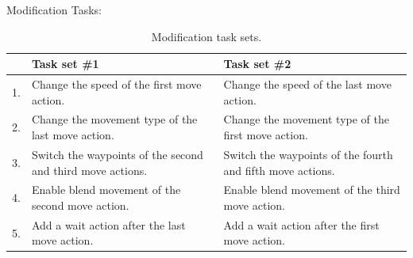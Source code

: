 Modification Tasks:
\begin{table}[H]
    \centering
    \begin{tabular}{p{} p{} p{}}
        \hline
           & \textbf{Task set \#1}                                      & \textbf{Task set \#2}                                      \\
        \hline
        1. & Change the speed of the first move action.                 & Change the speed of the last move action.                  \\
        2. & Change the movement type of the last move action.          & Change the movement type of the first move action.         \\
        3. & Switch the waypoints of the second and third move actions. & Switch the waypoints of the fourth and fifth move actions. \\
        4. & Enable blend movement of the second move action.           & Enable blend movement of the third move action.            \\
        5. & Add a wait action after the last move action.              & Add a wait action after the first move action.             \\
        \hline
    \end{tabular}
    \caption{Modification task sets.}
\end{table}

